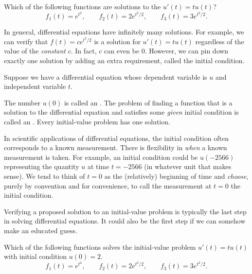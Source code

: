 \documentclass[../main.tex]{subfiles}
\begin{document}
\begin{example}
  Which of the following functions are solutions to the \(u'(t) = t u(t)\)?
  \[
    f_{1}(t) = e^{t^{2}}, \qquad f_{2}(t) = 2e^{t^{2}/2}, \qquad f_{3}(t) = 3e^{t^{2}/2}.
  \]
\end{example}
\clearpage

In general, differential equations have infinitely many solutions. For example, we can verify that \(f(t) = c e^{t^{2}/2}\) is a solution for \(u'(t) = t u(t)\) regardless of the value of the \emph{constant} \(c\). In fact, \(c\) can even be \(0\).  However, we can pin down exactly one solution by adding an extra requirement, called the initial condition.

\begin{definition}
  Suppose we have a differential equation whose dependent variable is \(u\) and independent variable \(t\). 

  The number \(u(0)\) is called an .  The problem of finding a function that is a solution to the differential equation and satisfies some \emph{given} initial condition is called an . Every initial-value problem has  one solution. 
\end{definition}

\faPencil*{} In scientific applications of differential equations, the initial condition often corresponds to a known measurement. There is flexibility in \emph{when} a known measurement is taken. For example, an initial condition could be \(u(-2566)\) representing the quantity \(u\) at time \(t = -2566\) (in whatever unit that makes sense).  We tend to think of \(t = 0\) as the (relatively) beginning of time and \emph{choose}, purely by convention and for convenience, to call the measurement at \(t = 0\) the initial condition.

\bigskip
Verifying a proposed solution to an initial-value problem is typically the last step in solving differential equations. It could also be the first step if we can somehow make an educated guess.
\begin{example}
  Which of the following functions solves the initial-value problem \(u'(t) = t u(t)\) with initial condition \(u(0) = 2\).
  \[
    f_{1}(t) = e^{t^{2}}, \qquad f_{2}(t) = 2e^{t^{2}/2}, \qquad f_{3}(t) = 3e^{t^{2}/2}.
  \]
\end{example}
\clearpage
\end{document}
